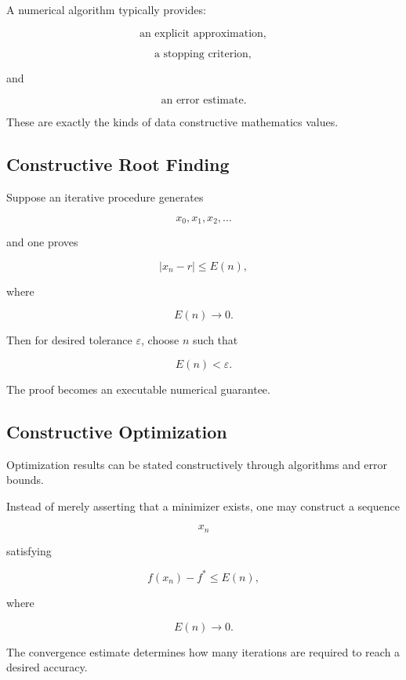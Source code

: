 A numerical algorithm typically provides:

\[
\boxed{
\text{an explicit approximation},
}
\]

\[
\boxed{
\text{a stopping criterion},
}
\]

and

\[
\boxed{
\text{an error estimate}.
}
\]

These are exactly the kinds of data constructive mathematics values.

\subsection{Constructive Root Finding}
\label{subsec:constructive-root-finding}

Suppose an iterative procedure generates

\[
x_0,x_1,x_2,\ldots
\]

and one proves

\[
\boxed{
|x_n-r|
\leq
E(n),
}
\]

where

\[
E(n)\to0.
\]

Then for desired tolerance \(\varepsilon\), choose \(n\) such that

\[
E(n)<\varepsilon.
\]

The proof becomes an executable numerical guarantee.

\subsection{Constructive Optimization}
\label{subsec:constructive-optimization}

Optimization results can be stated constructively through algorithms and
error bounds.

Instead of merely asserting that a minimizer exists, one may construct a
sequence

\[
x_n
\]

satisfying

\[
\boxed{
f(x_n)-f^*
\leq
E(n),
}
\]

where

\[
E(n)\to0.
\]

The convergence estimate determines how many iterations are required to
reach a desired accuracy.


